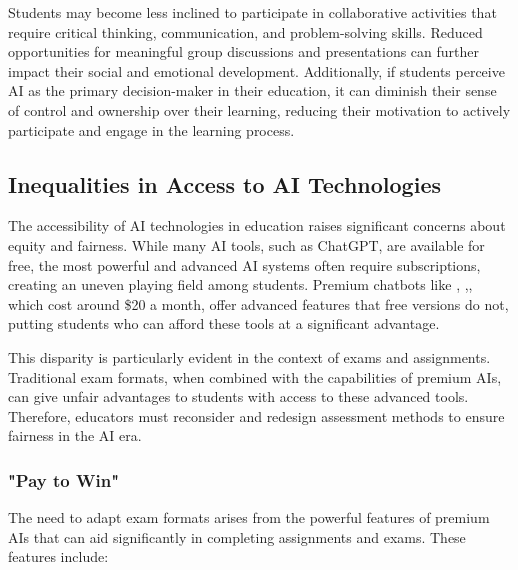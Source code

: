 \documentclass{article}
\begin{document}
Students may become less inclined to participate in collaborative activities
that require critical thinking, communication, and problem-solving skills.
Reduced opportunities for meaningful group discussions and presentations can
further impact their social and emotional development. Additionally,
if students perceive AI as the primary decision-maker in their education,
it can diminish their sense of control and ownership over their learning,
reducing their motivation to actively participate and engage in the
learning process.

\subsection{Inequalities in Access to AI Technologies}

The accessibility of AI technologies in education raises significant
concerns about equity and fairness. While many AI tools,
such as ChatGPT, are available for free, the most powerful
and advanced AI systems often require subscriptions,
creating an uneven playing field among students.
Premium chatbots like \cite[Claude 3 Opus]{anthropic2024claude},
\cite[ChatGPT Plus]{openai_pricing},\cite[Perplexity Pro]{perplexity2024pro},
which cost around \$20 a month,
offer advanced features that free versions do not,
putting students who can afford these tools at a significant advantage.

This disparity is particularly evident in the context of exams and assignments.
Traditional exam formats, when combined with the capabilities of premium AIs,
can give unfair advantages to students with access to these advanced tools.
Therefore, educators must reconsider and redesign assessment methods
to ensure fairness in the AI era.

\subsubsection{"Pay to Win"}

The need to adapt exam formats arises from the powerful features
of premium AIs that can aid significantly in completing assignments and exams.
These features include:
\end{document}
